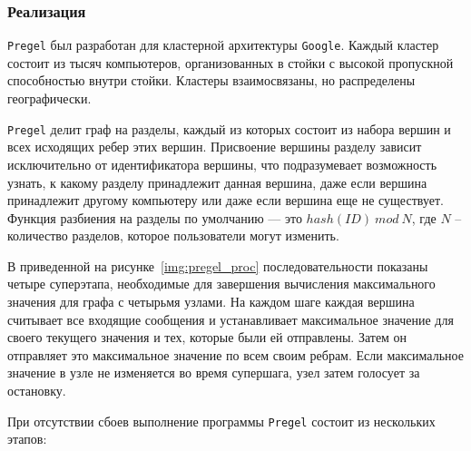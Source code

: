 \subsubsection{Реализация}

\texttt{Pregel} был разработан для кластерной архитектуры \texttt{Google}.
Каждый кластер состоит из тысяч компьютеров, организованных в стойки с высокой пропускной способностью внутри стойки. 
Кластеры взаимосвязаны, но распределены географически.

\texttt{Pregel} делит граф на разделы, каждый из которых состоит из набора вершин и всех исходящих ребер этих вершин. 
Присвоение вершины разделу зависит исключительно от идентификатора вершины, что подразумевает возможность узнать, к какому разделу принадлежит данная вершина, даже если вершина принадлежит другому компьютеру или даже если вершина еще не существует. 
Функция разбиения на разделы по умолчанию --- это $hash(ID)\ mod\ N$, где $N$ -- количество разделов, которое пользователи могут изменить.

В приведенной на рисунке~\ref{img:pregel_proc} последовательности показаны четыре суперэтапа, необходимые для завершения вычисления максимального значения для графа с четырьмя узлами. 
На каждом шаге каждая вершина считывает все входящие сообщения и устанавливает максимальное значение для своего текущего значения и тех, которые были ей отправлены. 
Затем он отправляет это максимальное значение по всем своим ребрам. 
Если максимальное значение в узле не изменяется во время супершага, узел затем голосует за остановку.


При отсутствии сбоев выполнение программы \texttt{Pregel} состоит из нескольких этапов:


